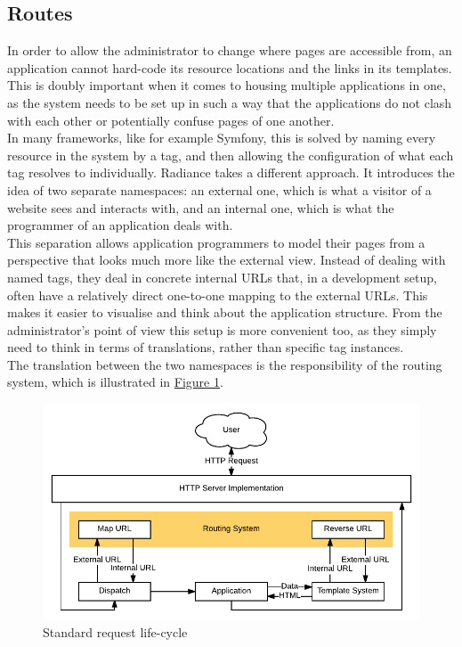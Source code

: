 \documentclass{sig-alternate}
\begin{document}
\subsection{Routes}
In order to allow the administrator to change where pages are accessible from, an application cannot hard-code its resource locations and the links in its templates. This is doubly important when it comes to housing multiple applications in one, as the system needs to be set up in such a way that the applications do not clash with each other or potentially confuse pages of one another. \\

In many frameworks, like for example Symfony\cite{symfony}, this is solved by naming every resource in the system by a tag, and then allowing the configuration of what each tag resolves to individually. Radiance takes a different approach. It introduces the idea of two separate namespaces: an external one, which is what a visitor of a website sees and interacts with, and an internal one, which is what the programmer of an application deals with. \\

This separation allows application programmers to model their pages from a perspective that looks much more like the external view. Instead of dealing with named tags, they deal in concrete internal URLs that, in a development setup, often have a relatively direct one-to-one mapping to the external URLs. This makes it easier to visualise and think about the application structure. From the administrator's point of view this setup is more convenient too, as they simply need to think in terms of translations, rather than specific tag instances. \\

The translation between the two namespaces is the responsibility of the routing system, which is illustrated in \hyperref[requestcycle]{Figure 1}. \\

\begin{figure}[h]
  \includegraphics[width=\columnwidth]{request}
  \caption{Standard request life-cycle}
  \label{requestcycle}
\end{figure}
\end{document}

